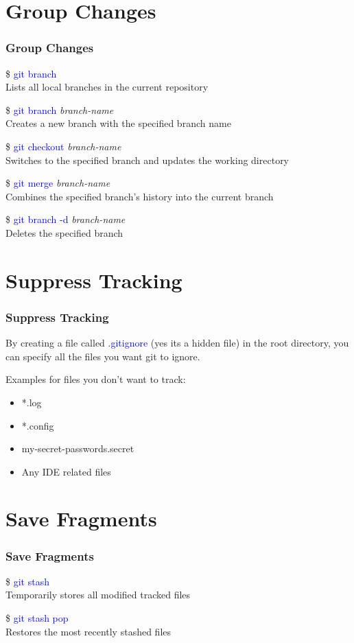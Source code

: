 \documentclass[aspectratio=169]{beamer}
\begin{document}
\section{Group Changes}
\begin{frame}

\frametitle{Group Changes}

\$ \textcolor{blue}{git branch}\\
Lists all local branches in the current repository

\$ \textcolor{blue}{git branch} \textit{branch-name}\\
Creates a new branch with the specified branch name

\$ \textcolor{blue}{git checkout} \textit{branch-name}\\
Switches to the specified branch and updates the working directory

\$ \textcolor{blue}{git merge} \textit{branch-name}\\
Combines the specified branch's history into the current branch

\$ \textcolor{blue}{git branch -d} \textit{branch-name}\\
Deletes the specified branch

\end{frame}

\section{Suppress Tracking}
\begin{frame}

\frametitle{Suppress Tracking}

By creating a file called \textcolor{blue}{.gitignore} (yes its a hidden file) in the root directory, you can specify all the files you want git to ignore.

Examples for files you don't want to track:

\begin{itemize}

\item *.log
\item *.config
\item my-secret-passwords.secret
\item Any IDE related files

\end{itemize}

\end{frame}

\section{Save Fragments}
\begin{frame}

\frametitle{Save Fragments}

\$ \textcolor{blue}{git stash}\\
Temporarily stores all modified tracked files

\$ \textcolor{blue}{git stash pop}\\
Restores the most recently stashed files

\end{frame}
\end{document}
